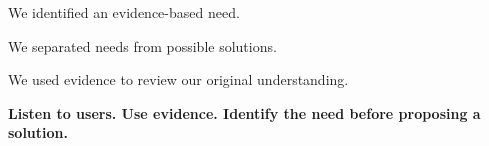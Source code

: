 \documentclass[12pt,a4paper]{article}
\newcommand{\checkbox}{\fbox{\rule{0pt}{0.8ex}\rule{0.8ex}{0pt}}}
\begin{document}
	\vspace{0.12cm}
	
	\noindent\checkbox\quad We identified an evidence-based need.
	
	\vspace{0.12cm}
	
	\noindent\checkbox\quad We separated needs from possible solutions.
	
	\vspace{0.12cm}
	
	\noindent\checkbox\quad We used evidence to review our original understanding.
	
	\vspace{0.3cm}
	
	\begin{center}
		\textbf{Listen to users. Use evidence. Identify the need before proposing a solution.}
	\end{center}
	
\end{document}
